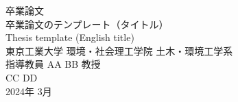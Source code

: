 \documentclass[../main/main]{subfiles}
\begin{document}
\begin{titlepage}
\begin{center}
\vspace{100truept}
{\Large 卒業論文}\\
\vspace{50truept}
{\huge 卒業論文のテンプレート（タイトル）}\\
\vspace{15truept}
{\large Thesis template (English title)}\\ %
\vspace{250truept}
{\large 東京工業大学 環境・社会理工学院 土木・環境工学系}\\
\vspace{40truept}
{\large
指導教員 AA BB 教授
}\\
\vspace{40truept}
{\large CC DD}\\ %
\vspace{40truept}
{\large 2024年 3月}\\ %
\end{center}
\end{titlepage}
\end{document}
